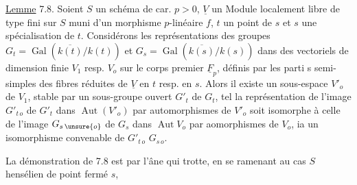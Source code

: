 \uline{Lemme} 7.8. Soient $S$ un schéma de car. $p>0$, $\underline{V}$ un Module localement libre de type fini sur $S$ muni d'un morphisme $p$-linéaire $f$, $t$ un point de $s$ et $s$ une spécialisation de $t$. Considérons les représentations des groupes $G_t=\operatorname{Gal}(\overline{k(t)}/k(t))$ et $G_s=\operatorname{Gal}(\overline{k(s)}/k(s))$ dans des vectoriels de dimension finie $V_1$ resp. $V_o$ sur le corps premier $\underline{F}_p$, définis par les parti s semi-simples des fibres  réduites de $\underline{V}$ en $t$ resp. en $s$. Alors il existe un sous-espace $V'_o$ de $V_1$, stable par un sous-groupe ouvert $G'_t$ de $G_t$, tel  la représentation de l'image $G'_{t\,o}$ de $G'_t$ dans  $\operatorname{Aut}(V'_o)$ par automorphismes de $V'_o$ soit isomorphe à celle de l'image $G_{s\,\unsure{o}}$
de $G_s$ dans $\operatorname{Aut}V_o$ par aomorphismes de $V_o$, ia un isomorphisme convenable de $G'_{t\,o}$  $G_{s\,o}$.

La démonstration de 7.8 est par l'âne qui trotte, en se ramenant au cas $S$  hensélien de point fermé $s$, 


